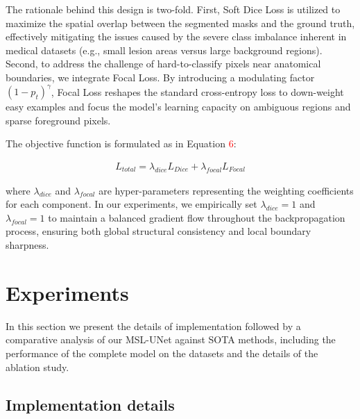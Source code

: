 \documentclass[10pt, a4paper, twocolumn]{article}
\begin{document}
The rationale behind this design is two-fold. First, Soft Dice Loss is utilized to maximize the spatial overlap between the segmented masks and the ground truth, effectively mitigating the issues caused by the severe class imbalance inherent in medical datasets (e.g., small lesion areas versus large background regions). Second, to address the challenge of hard-to-classify pixels near anatomical boundaries, we integrate Focal Loss. By introducing a modulating factor $(1 - p_t)^\gamma$, Focal Loss reshapes the standard cross-entropy loss to down-weight easy examples and focus the model's learning capacity on ambiguous regions and sparse foreground pixels.

The objective function is formulated as in Equation \textcolor{red}{6}:

\begin{footnotesize}   
\begin{align}
  L_{total} = \lambda_{dice} L_{Dice} + \lambda_{focal} L_{Focal}
\end{align}
\end{footnotesize}

where $\lambda_{dice}$ and $\lambda_{focal}$ are hyper-parameters representing the weighting coefficients for each component. In our experiments, we empirically set $\lambda_{dice} = 1$ and $\lambda_{focal} = 1$ to maintain a balanced gradient flow throughout the backpropagation process, ensuring both global structural consistency and local boundary sharpness.

\section{Experiments}

In this section we present the details of implementation followed by a comparative analysis of our MSL-UNet against SOTA methods, including the performance of the complete model on the datasets and the details of the ablation study.

\subsection{Implementation details}
\end{document}
